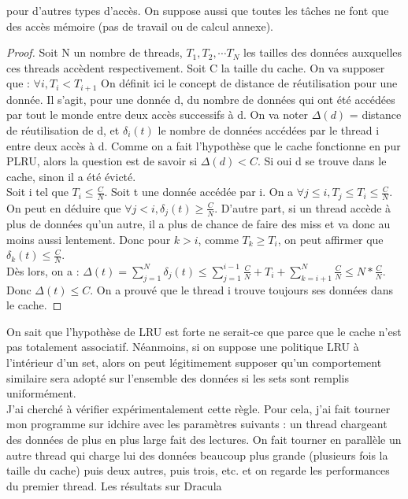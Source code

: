 \documentclass{report}
\begin{document}
pour d'autres types d'accès. On suppose aussi que toutes les tâches ne font que des accès mémoire
(pas de travail ou de calcul annexe). 
\begin{proof}
Soit N un nombre de threads, $T_1, T_2, \cdots T_N$ les tailles des données auxquelles ces threads
accèdent respectivement. Soit C la taille du cache. On va supposer que :
$\forall i, T_{i} < T_{i+1}$
On définit ici le concept de distance de réutilisation pour une donnée. Il s'agit, pour une 
donnée d, du nombre de données qui ont été accédées par tout le monde entre deux accès successifs
à d. On va noter $\Delta(d)$ = distance de réutilisation de d, et $\delta_{i}(t)$ le nombre de 
données accédées par le thread i entre deux accès à d.
Comme on a fait l'hypothèse que le cache fonctionne en pur PLRU, alors la question est de
savoir si $\Delta(d) < C$. Si oui d se trouve dans le cache, sinon il a été évicté.
\\Soit i tel que $T_i \leq \frac{C}{N}$. Soit t une donnée accédée par i.
On a $\forall j \leq i, T_{j} \leq T_{i} \leq \frac{C}{N}$.  On peut en déduire que $\forall j < i, 
\delta_{j}(t) \geq \frac{C}{N}$.
D'autre part, si un thread accède à plus de données qu'un autre, il a plus de chance de faire
des miss et va donc au moins aussi lentement.
Donc pour $k > i$, comme ${T_{k}}\geq{T_{i}}$, on peut affirmer que $\delta_k(t)\leq \frac{C}{N}$.
\\Dès lors, on a : $\Delta(t) = \sum_{j=1}^{N} {\delta_{j}(t)} \leq \sum_{j=1}^{i-1}{\frac{C}{N}} + 
T_i + \sum_{k=i+1}^{N}{\frac{C}{N}} \leq N * \frac{C}{N} $.
\\Donc $\Delta(t) \leq C$. On a prouvé que le thread i trouve toujours ses données dans le cache.
\end{proof}
On sait que l'hypothèse de LRU est forte ne serait-ce que parce que le cache n'est pas totalement
associatif. Néanmoins, si on suppose une politique LRU à l'intérieur d'un set, alors on peut 
légitimement supposer qu'un comportement similaire sera adopté sur l'ensemble des données si 
les sets sont remplis uniformément.
\\J'ai cherché à vérifier expérimentalement cette règle. Pour cela, j'ai fait tourner mon
programme sur idchire avec les paramètres suivants : un thread chargeant des données de plus
en plus large fait des lectures. On fait tourner en parallèle un autre thread qui charge lui 
des données beaucoup plus grande (plusieurs fois la taille du cache) puis deux autres, puis 
trois, etc. et on regarde les performances du premier thread. Les résultats sur Dracula
\end{document}

